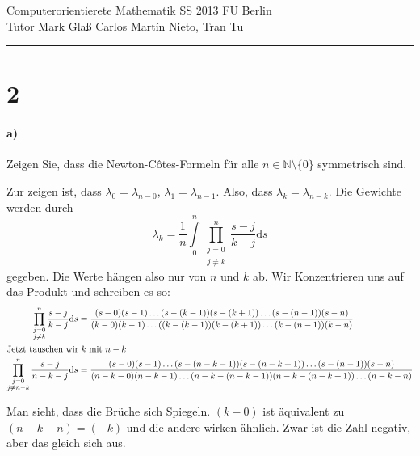 \documentclass[ngerman,a4paper]{scrartcl}
\newcommand{\N}{\ensuremath{\mathbb{N}}}
\begin{document}
{\sffamily
  \hfill
  Computerorientierete Mathematik SS 2013\hfill
  FU Berlin\\[8pt]
  \hfill Tutor Mark Glaß \hfill Carlos Martín Nieto, Tran Tu\hrule \bigskip
}

\section*{2}

\paragraph{a)}

Zeigen Sie, dass die Newton-Côtes-Formeln für alle
$n\in\N\setminus\{0\}$ symmetrisch sind.

Zur zeigen ist, dass $\lambda_0 = \lambda_{n-0}$, $\lambda_1 =
\lambda_{n-1}$. Also, dass $\lambda_k = \lambda_{n-k}$. Die Gewichte
werden durch
\[
\lambda_k = \frac{1}{n} \int\limits^n_0\prod^n_{\substack{j=0\\j\neq k}} \frac{s-j}{k-j}\text{d}s
\]
gegeben. Die Werte hängen also nur von $n$ und $k$ ab. Wir
Konzentrieren uns auf das Produkt und schreiben es so:
\begin{align*}
  \prod^n_{\substack{j=0\\j\neq k}} \frac{s-j}{k-j}\text{d}s &= \frac{(s-0)(s-1)\dots(s-(k-1))(s-(k+1))\dots(s-(n-1))(s-n)}
  {(k-0)(k-1)\dots((k-(k-1))(k-(k+1))\dots(k-(n-1))(k-n)}\\
  \intertext{Jetzt tauschen wir $k$ mit $n-k$}
  \prod^n_{\substack{j=0\\j\neq n-k}} \frac{s-j}{n-k-j}\text{d}s &= \frac{(s-0)(s-1)\dots(s-(n-k-1))(s-(n-k+1))\dots(s-(n-1))(s-n)}
  {(n-k-0)(n-k-1)\dots(n-k-(n-k-1))(n-k-(n-k+1))\dots(n-k-n)}
\end{align*}

Man sieht, dass die Brüche sich Spiegeln. $(k-0)$ ist äquivalent zu
$(n-k-n)=(-k)$ und die andere wirken ähnlich. Zwar ist die Zahl
negativ, aber das gleich sich aus.
\end{document}

